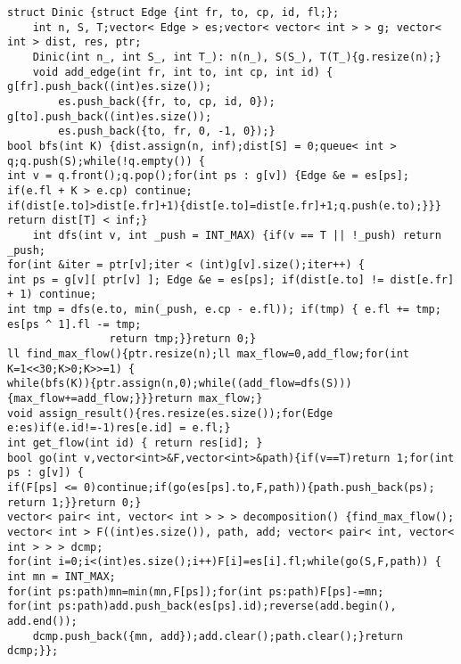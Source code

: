 \documentclass[a4paper,12pt]{article}
\begin{document}
\begin{verbatim}
struct Dinic {struct Edge {int fr, to, cp, id, fl;};
    int n, S, T;vector< Edge > es;vector< vector< int > > g; vector< int > dist, res, ptr;
    Dinic(int n_, int S_, int T_): n(n_), S(S_), T(T_){g.resize(n);}
    void add_edge(int fr, int to, int cp, int id) { g[fr].push_back((int)es.size());
        es.push_back({fr, to, cp, id, 0}); g[to].push_back((int)es.size());
        es.push_back({to, fr, 0, -1, 0});}
bool bfs(int K) {dist.assign(n, inf);dist[S] = 0;queue< int > q;q.push(S);while(!q.empty()) {
int v = q.front();q.pop();for(int ps : g[v]) {Edge &e = es[ps]; if(e.fl + K > e.cp) continue;
if(dist[e.to]>dist[e.fr]+1){dist[e.to]=dist[e.fr]+1;q.push(e.to);}}} return dist[T] < inf;}
    int dfs(int v, int _push = INT_MAX) {if(v == T || !_push) return _push;
for(int &iter = ptr[v];iter < (int)g[v].size();iter++) {
int ps = g[v][ ptr[v] ]; Edge &e = es[ps]; if(dist[e.to] != dist[e.fr] + 1) continue;
int tmp = dfs(e.to, min(_push, e.cp - e.fl)); if(tmp) { e.fl += tmp; es[ps ^ 1].fl -= tmp;
                return tmp;}}return 0;}
ll find_max_flow(){ptr.resize(n);ll max_flow=0,add_flow;for(int K=1<<30;K>0;K>>=1) {
while(bfs(K)){ptr.assign(n,0);while((add_flow=dfs(S))){max_flow+=add_flow;}}}return max_flow;}
void assign_result(){res.resize(es.size());for(Edge e:es)if(e.id!=-1)res[e.id] = e.fl;}
int get_flow(int id) { return res[id]; }
bool go(int v,vector<int>&F,vector<int>&path){if(v==T)return 1;for(int ps : g[v]) {
if(F[ps] <= 0)continue;if(go(es[ps].to,F,path)){path.push_back(ps); return 1;}}return 0;}
vector< pair< int, vector< int > > > decomposition() {find_max_flow();
vector< int > F((int)es.size()), path, add; vector< pair< int, vector< int > > > dcmp;
for(int i=0;i<(int)es.size();i++)F[i]=es[i].fl;while(go(S,F,path)) { int mn = INT_MAX;
for(int ps:path)mn=min(mn,F[ps]);for(int ps:path)F[ps]-=mn;
for(int ps:path)add.push_back(es[ps].id);reverse(add.begin(), add.end());
    dcmp.push_back({mn, add});add.clear();path.clear();}return dcmp;}};
\end{verbatim}
\end{document}
